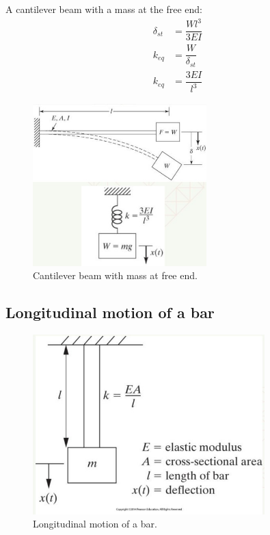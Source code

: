 \documentclass[class=report, crop=false, 12pt,a4paper]{standalone}
\begin{document}
A cantilever beam with a mass at the free end:
\begin{align}
    \delta_{st} &= \dfrac{Wl^3}{3EI}\\
    k_{eq} &= \dfrac{W}{\delta_{st}}\\
    k_{eq} &= \dfrac{3EI}{l^3}
\end{align}
\begin{figure}[H]
    \centering
    \includegraphics[width = 0.6\textwidth]{../img/diagram18.jpg}
    \caption{Cantilever beam with mass at free end.}
\end{figure}
\subsection{Longitudinal motion of a bar}
\begin{figure}[H]
    \centering
    \includegraphics[width = 0.8\textwidth]{../img/diagram19.jpg}
    \caption{Longitudinal motion of a bar.}
\end{figure}
\end{document}
